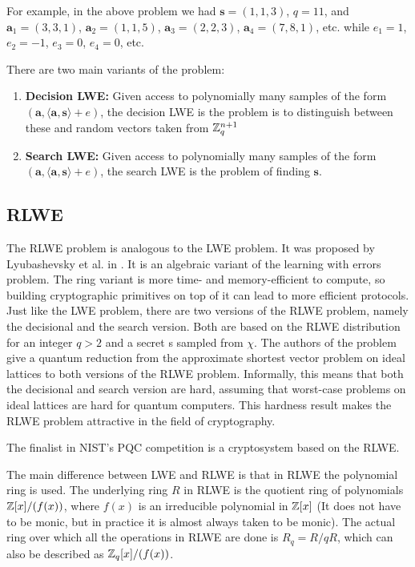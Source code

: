 \documentclass[12pt]{article}
\theoremstyle{plain}
\theoremstyle{definition}
\theoremstyle{remark}
\begin{document}
For example, in the above problem we had $\mathbf{s}=(1, 1, 3)$, $q=11$, and $\mathbf{a}_1 = (3,3,1)$, $\mathbf{a}_2 = (1,1,5)$, $\mathbf{a}_3 = (2,2,3)$, $\mathbf{a}_4 = (7,8,1)$, etc. while $e_1=1$, $e_2=-1$, $e_3=0$, $e_4=0$, etc. 

There are two main variants of the problem:
\begin{enumerate}
    \item {\bf Decision LWE:} Given access to polynomially many samples of the form $(\mathbf{a}, \langle \mathbf{a}, \mathbf{s}\rangle+e)$, the decision LWE is the problem is to distinguish between these and random vectors taken from $\mathbb{Z}_q^{n+1}$
    \item {\bf Search LWE:} Given access to polynomially many samples of the form $(\mathbf{a}, \langle \mathbf{a}, \mathbf{s}\rangle+e)$, the search LWE is the problem of finding $\mathbf{s}$. 
    \end{enumerate}

\subsection{RLWE} The RLWE problem is analogous to the LWE problem. It was proposed by
Lyubashevsky et al. in \cite{RLWE-1}. It is an algebraic variant of the learning with errors problem. The ring variant is more time- and memory-efficient to compute, so building
cryptographic primitives on top of it can lead to more efficient protocols. Just like the LWE problem, there are two versions of the RLWE problem, namely the decisional and the
search version. Both are based on the RLWE distribution for an integer $q > 2$ and
a secret s sampled from $\mathcal{\chi}$. The authors of the problem give a quantum reduction
from the approximate shortest vector problem on ideal lattices to both versions of
the RLWE problem. Informally, this means that both the decisional and search
version are hard, assuming that worst-case problems on ideal lattices are hard for
quantum computers. This hardness result makes the RLWE problem attractive in the field of cryptography. 

The finalist in NIST's PQC competition is a cryptosystem based on the RLWE. 

The main difference between LWE and RLWE is that in RLWE the polynomial ring is used. The underlying ring $R$ in RLWE is the quotient ring of polynomials $\mathbb{Z}[x]/(f(x))$, where $f(x)$ is an irreducible polynomial in $\mathbb{Z}[x]$ (It does not have to be monic, but in practice it is almost always taken to be monic). The actual ring over which all the operations in RLWE are done is $R_q = R/qR$, which can also be described as $\mathbb{Z}_q[x]/(f(x))$. 
\end{document}
